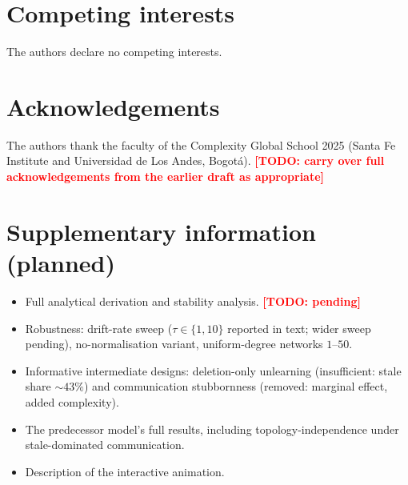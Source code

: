 \documentclass{article}
\newcommand{\todo}[1]{\textcolor{red}{\textbf{[TODO: #1]}}}
\begin{document}
\section*{Competing interests}
The authors declare no competing interests.

\section*{Acknowledgements}
The authors thank the faculty of the Complexity Global School 2025 (Santa Fe Institute and Universidad de Los Andes, Bogot\'a). \todo{carry over full acknowledgements from the earlier draft as appropriate}

\printbibliography

\appendix
\section*{Supplementary information (planned)}
\begin{itemize}
  \item Full analytical derivation and stability analysis. \todo{pending}
  \item Robustness: drift-rate sweep ($\tau \in \{1, 10\}$ reported in text; wider sweep pending), no-normalisation variant, uniform-degree networks $1$--$50$.
  \item Informative intermediate designs: deletion-only unlearning (insufficient: stale share ${\sim}43\%$) and communication stubbornness (removed: marginal effect, added complexity).
  \item The predecessor model's full results, including topology-independence under stale-dominated communication.
  \item Description of the interactive animation.
\end{itemize}
\end{document}
